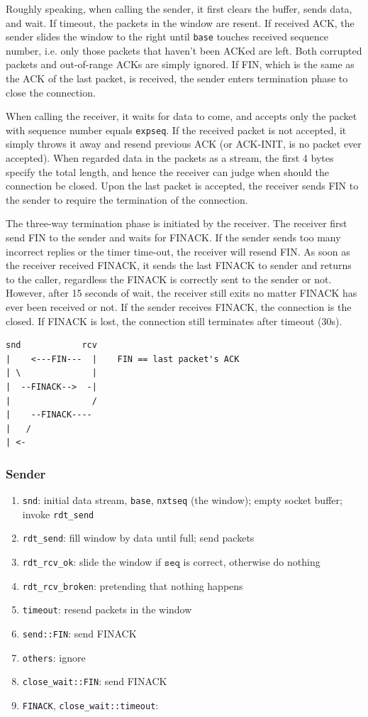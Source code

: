 \documentclass[10pt,a4paper]{article}
\begin{document}
    Roughly speaking, when calling the sender, it first clears the buffer, sends data, and wait. If timeout, the packets in the window are resent. If received ACK, the sender slides the window to the right until \texttt{base} touches received sequence number, i.e. only those packets that haven't been ACKed are left. Both corrupted packets and out-of-range ACKs are simply ignored. If FIN, which is the same as the ACK of the last packet, is received, the sender enters termination phase to close the connection.

    When calling the receiver, it waits for data to come, and accepts only the packet with sequence number equals \texttt{expseq}. If the received packet is not accepted, it simply throws it away and resend previous ACK (or ACK-INIT, is no packet ever accepted). When regarded data in the packets as a stream, the first 4 bytes specify the total length, and hence the receiver can judge when should the connection be closed. Upon the last packet is accepted, the receiver sends FIN to the sender to require the termination of the connection.

    The three-way termination phase is initiated by the receiver. The receiver first send FIN to the sender and waits for FINACK. If the sender sends too many incorrect replies or the timer time-out, the receiver will resend FIN. As soon as the receiver received FINACK, it sends the last FINACK to sender and returns to the caller, regardless the FINACK is correctly sent to the sender or not. However, after 15 seconds of wait, the receiver still exits no matter FINACK  has ever been received or not. If the sender receives FINACK, the connection is the closed. If FINACK is lost, the connection still terminates after timeout (30s).
\begin{verbatim}
snd            rcv
|    <---FIN---  |    FIN == last packet's ACK
| \              |
|  --FINACK-->  -|
|                /
|    --FINACK----
|   /
| <-
\end{verbatim}
    \subsubsection{Sender}
    \begin{enumerate}
    	\item \texttt{snd}: initial data stream, \texttt{base}, \texttt{nxtseq} (the window); empty socket buffer; invoke \texttt{rdt\_send}
        \item \texttt{rdt\_send}: fill window by data until full; send packets
        \item \texttt{rdt\_rcv\_ok}: slide the window if $\texttt{seq}$ is correct, otherwise do nothing
        \item \texttt{rdt\_rcv\_broken}: pretending that nothing happens
        \item \texttt{timeout}: resend packets in the window
        \item \texttt{send::FIN}: send FINACK
        \item \texttt{others}: ignore
        \item \texttt{close\_wait::FIN}: send FINACK
        \item \texttt{FINACK}, \texttt{close\_wait::timeout}:
    \end{enumerate}
\end{document}
